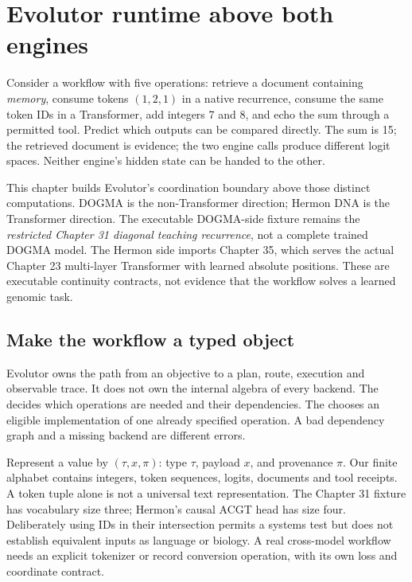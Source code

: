 \chapter{Evolutor runtime above both engines}
\label{evod39:chapter}

Consider a workflow with five operations: retrieve a document containing
\emph{memory}, consume tokens $(1,2,1)$ in a native recurrence, consume the
same token IDs in a Transformer, add integers 7 and 8, and echo the sum through
a permitted tool. Predict which outputs can be compared directly. The sum is
15; the retrieved document is evidence; the two engine calls produce different
logit spaces. Neither engine's hidden state can be handed to the other.

This chapter builds Evolutor's coordination boundary above those distinct
computations. DOGMA is the non-Transformer direction; Hermon DNA is the
Transformer direction. The executable DOGMA-side fixture remains the
\emph{restricted Chapter 31 diagonal teaching recurrence}, not a complete
trained DOGMA model. The Hermon side imports Chapter 35, which serves the
actual Chapter 23 multi-layer Transformer with learned absolute positions.
These are executable continuity contracts, not evidence that the workflow
solves a learned genomic task.

\section{Make the workflow a typed object}
\label{evod39:typed}
Evolutor owns the path from an objective to a plan, route, execution and
observable trace. It does not own the internal algebra of every backend.
The  decides which operations are needed and their dependencies.
The  chooses an eligible implementation of one already specified
operation. A bad dependency graph and a missing backend are different errors.


Represent a value by $(\tau,x,\pi)$: type $\tau$, payload $x$, and provenance
$\pi$. Our finite alphabet contains integers, token sequences, logits,
documents and tool receipts. A token tuple alone is not a universal text
representation. The Chapter 31 fixture has vocabulary size three; Hermon's
causal ACGT head has size four. Deliberately using IDs in their intersection
permits a systems test but does not establish equivalent inputs as language
or biology. A real cross-model workflow needs an explicit tokenizer or
record conversion operation, with its own loss and coordinate contract.

